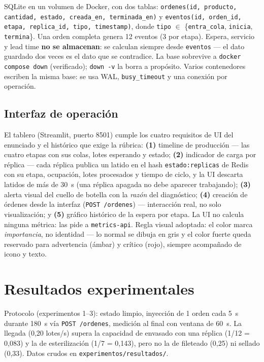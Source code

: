 \documentclass[12pt,a4paper]{article}
\begin{document}
SQLite en un volumen de Docker, con dos tablas:
\texttt{ordenes(id, producto, cantidad, estado, creada\_en, terminada\_en)} y
\texttt{eventos(id, orden\_id, etapa, replica\_id, tipo, timestamp)}, donde
\texttt{tipo} $\in$ \{\texttt{entra\_cola}, \texttt{inicia}, \texttt{termina}\}.
Una orden completa genera 12 eventos (3 por etapa). Espera, servicio y lead
time \textbf{no se almacenan}: se calculan siempre desde \texttt{eventos} — el
dato guardado dos veces es el dato que se contradice. La base sobrevive a
\texttt{docker compose down} (verificado); \texttt{down -v} la borra a
propósito. Varios contenedores escriben la misma base: se usa WAL,
\texttt{busy\_timeout} y una conexión por operación.

\subsection{Interfaz de operación}

El tablero (Streamlit, puerto 8501) cumple los cuatro requisitos de UI del
enunciado y el histórico que exige la rúbrica: \textbf{(1)} timeline de
producción — las cuatro etapas con sus colas, lotes esperando y estado;
\textbf{(2)} indicador de carga por réplica — cada réplica publica un latido en
el hash \texttt{estado:replicas} de Redis con su etapa, ocupación, lotes
procesados y tiempo de ciclo, y la UI descarta latidos de más de 30~s (una
réplica apagada no debe aparecer trabajando); \textbf{(3)} alerta visual del
cuello de botella con la \emph{razón} del diagnóstico; \textbf{(4)} creación de
órdenes desde la interfaz (\texttt{POST /ordenes}) — interacción real, no solo
visualización; y \textbf{(5)} gráfico histórico de la espera por etapa.
La UI no calcula ninguna métrica: las pide a \texttt{metrics-api}. Regla visual
adoptada: el color marca \emph{importancia}, no identidad — lo normal se dibuja
en gris y el color fuerte queda reservado para advertencia (ámbar) y crítico
(rojo), siempre acompañado de icono y texto.

\section{Resultados experimentales}
\label{sec:experimentos}

Protocolo (experimentos 1--3): estado limpio, inyección de 1 orden cada 5~s
durante 180~s vía \texttt{POST /ordenes}, medición al final con ventana de
60~s. La llegada (0{,}20 lotes/s) supera la capacidad de envasado con una
réplica (1/12 = 0{,}083) y la de esterilización (1/7 = 0{,}143), pero no la de
fileteado (0{,}25) ni sellado (0{,}33). Datos crudos en
\texttt{experimentos/resultados/}.
\end{document}
